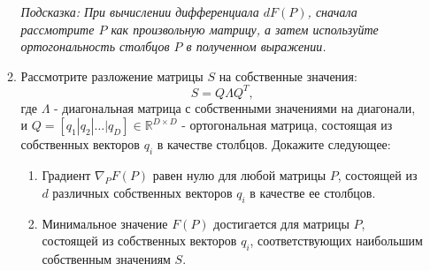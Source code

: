 \documentclass[
  russian,
  letterpaper,
  DIV=11,
  numbers=noendperiod]{scrartcl}
\providecommand{\tightlist}{%
  \setlength{\itemsep}{0pt}\setlength{\parskip}{0pt}}
\begin{document}
\begin{enumerate}
\begin{enumerate}
    \emph{Подсказка: При вычислении дифференциала \(dF(P)\), сначала
    рассмотрите \(P\) как произвольную матрицу, а затем используйте
    ортогональность столбцов \(P\) в полученном выражении.}
  \item
    Рассмотрите разложение матрицы \(S\) на собственные значения: \[
     S = Q \Lambda Q^T,
     \] где \(\Lambda\) - диагональная матрица с собственными значениями
    на диагонали, и
    \(Q = [q_1 | q_2 | \ldots | q_D] \in \mathbb{R}^{D \times D}\) -
    ортогональная матрица, состоящая из собственных векторов \(q_i\) в
    качестве столбцов. Докажите следующее:

    \begin{enumerate}
    \def\labelenumiii{\arabic{enumiii}.}
    \tightlist
    \item
      Градиент \(\nabla_P F(P)\) равен нулю для любой матрицы \(P\),
      состоящей из \(d\) различных собственных векторов \(q_i\) в
      качестве ее столбцов.
    \item
      Минимальное значение \(F(P)\) достигается для матрицы \(P\),
      состоящей из собственных векторов \(q_i\), соответствующих
      наибольшим собственным значениям \(S\).
    \end{enumerate}
  \end{enumerate}
\end{enumerate}
\end{document}
